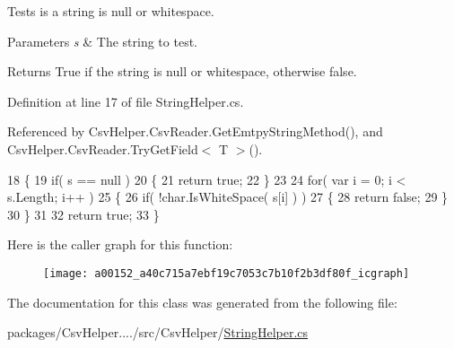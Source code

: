 Tests is a string is null or whitespace. 


\begin{DoxyParams}{Parameters}
{\em s} & The string to test.\\
\hline
\end{DoxyParams}
\begin{DoxyReturn}{Returns}
True if the string is null or whitespace, otherwise false.
\end{DoxyReturn}


Definition at line 17 of file String\-Helper.\-cs.



Referenced by Csv\-Helper.\-Csv\-Reader.\-Get\-Emtpy\-String\-Method(), and Csv\-Helper.\-Csv\-Reader.\-Try\-Get\-Field$<$ T $>$().


\begin{DoxyCode}
18         \{
19             \textcolor{keywordflow}{if}( s == null )
20             \{
21                 \textcolor{keywordflow}{return} \textcolor{keyword}{true};
22             \}
23 
24             \textcolor{keywordflow}{for}( var i = 0; i < s.Length; i++ )
25             \{
26                 \textcolor{keywordflow}{if}( !\textcolor{keywordtype}{char}.IsWhiteSpace( s[i] ) )
27                 \{
28                     \textcolor{keywordflow}{return} \textcolor{keyword}{false};
29                 \}
30             \}
31 
32             \textcolor{keywordflow}{return} \textcolor{keyword}{true};
33         \}
\end{DoxyCode}


Here is the caller graph for this function\-:
\nopagebreak
\begin{figure}[H]
\begin{center}
\leavevmode
\texttt{[image: a00152\_a40c715a7ebf19c7053c7b10f2b3df80f\_icgraph]}
\end{center}
\end{figure}




The documentation for this class was generated from the following file\-:\begin{DoxyCompactItemize}
\item 
packages/\-Csv\-Helper..../src/\-Csv\-Helper/\hyperlink{a00238}{String\-Helper.\-cs}\end{DoxyCompactItemize}
